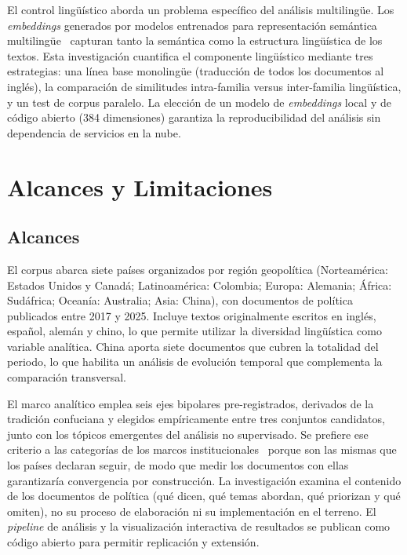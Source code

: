 El control lingüístico aborda un problema específico del análisis multilingüe. Los \textit{embeddings} generados por modelos entrenados para representación semántica multilingüe~\citep{reimers2019sentencebert} capturan tanto la semántica como la estructura lingüística de los textos. Esta investigación cuantifica el componente lingüístico mediante tres estrategias: una línea base monolingüe (traducción de todos los documentos al inglés), la comparación de similitudes intra-familia versus inter-familia lingüística, y un test de corpus paralelo. La elección de un modelo de \textit{embeddings} local y de código abierto (384 dimensiones) garantiza la reproducibilidad del análisis sin dependencia de servicios en la nube.


\section{Alcances y Limitaciones}
\label{sec:alcances}

\subsection{Alcances}
\label{subsec:alcances}

El corpus abarca siete países organizados por región geopolítica (Norteamérica: Estados Unidos y Canadá; Latinoamérica: Colombia; Europa: Alemania; África: Sudáfrica; Oceanía: Australia; Asia: China), con documentos de política publicados entre 2017 y 2025. Incluye textos originalmente escritos en inglés, español, alemán y chino, lo que permite utilizar la diversidad lingüística como variable analítica. China aporta siete documentos que cubren la totalidad del periodo, lo que habilita un análisis de evolución temporal que complementa la comparación transversal.

El marco analítico emplea seis ejes bipolares pre-registrados, derivados de la tradición confuciana y elegidos empíricamente entre tres conjuntos candidatos, junto con los tópicos emergentes del análisis no supervisado. Se prefiere ese criterio a las categorías de los marcos institucionales~\citep{oecd2021epo,unesco2019beijing,miao2021guidance} porque son las mismas que los países declaran seguir, de modo que medir los documentos con ellas garantizaría convergencia por construcción. La investigación examina el contenido de los documentos de política (qué dicen, qué temas abordan, qué priorizan y qué omiten), no su proceso de elaboración ni su implementación en el terreno. El \textit{pipeline} de análisis y la visualización interactiva de resultados se publican como código abierto para permitir replicación y extensión.

